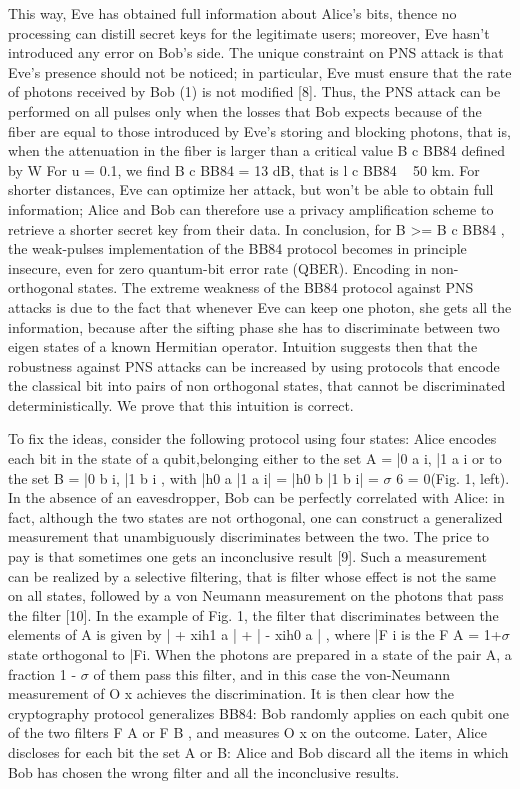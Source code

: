 This way, Eve has obtained full information about Alice’s bits, thence no processing can distill secret keys for the legitimate users; moreover, Eve hasn't introduced any error on Bob’s side.
The unique constraint on PNS attack is that Eve’s presence should not be noticed; in particular, Eve must ensure that the rate of photons received by Bob (1) is not modified [8]. Thus, the PNS attack can be performed on all pulses only when the losses that Bob expects because of the fiber are equal to those introduced by Eve’s storing and blocking photons, that is, when the attenuation in the fiber is larger than a critical value B c BB84 defined by W For u = 0.1, we find B c BB84 = 13 dB, that is l c BB84 ~ 50 km. For shorter distances, Eve can optimize her attack, but won’t be able to obtain full information; Alice and Bob can therefore use a privacy amplification scheme to retrieve a shorter secret key from their data. In conclusion, for B >= B c BB84 , the weak-pulses implementation of the BB84 protocol becomes in principle insecure, even for zero quantum-bit error rate (QBER).
Encoding in non-orthogonal states. The extreme weakness of the BB84 protocol against PNS attacks is due to the fact that whenever Eve can keep one photon, she gets all the information, because after the sifting phase she has to discriminate between two eigen states of a known Hermitian operator. Intuition suggests then that the robustness against PNS attacks can be increased by using protocols that encode the classical bit into pairs of non orthogonal states, that cannot be discriminated deterministically. We prove that this intuition is correct.

To fix the ideas, consider the following protocol using four states: Alice encodes each bit in the state of a qubit,belonging  either to the set A = |0 a i, |1 a i or to the set B = |0 b i, |1 b i , with |h0 a |1 a i| = |h0 b |1 b i| = $\sigma$ 6 = 0(Fig. 1, left). In the absence of an eavesdropper, Bob can be perfectly correlated with Alice: in fact, although the two states are not orthogonal, one can construct a generalized measurement that unambiguously discriminates between the two. The price to pay is that sometimes one gets an inconclusive result [9]. Such a measurement can be realized by a selective filtering, that is filter whose effect is not the same on all states, followed by a von Neumann measurement on the photons that pass the filter [10]. In the example of Fig. 1, the filter that discriminates between the elements of A is given by | + xih1 a | + | - xih0 a  | , where |F  i is the F A =  1+$\sigma$ state orthogonal to |Fi. When the photons are prepared in a state of the pair A, a fraction 1 - $\sigma$ of them pass this filter, and in this case the von-Neumann measurement of O x achieves the discrimination. It is then clear how the cryptography protocol generalizes BB84: Bob randomly applies on each qubit one of the two filters F A or F B , and measures O x on the outcome. Later, Alice discloses for each bit the set A or B: Alice and Bob discard all the items in which Bob has chosen the wrong filter and all the inconclusive results.

